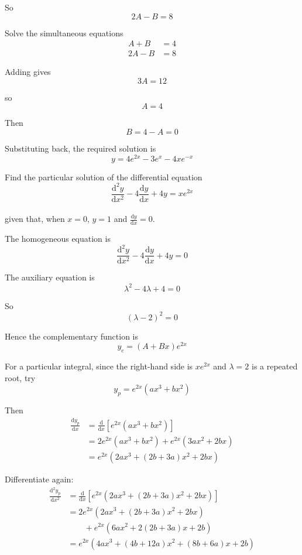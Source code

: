 \documentclass[leqno]{article}
\begin{document}
\begin{enumerate}[
  label=\textbf{\arabic*.},
  leftmargin=*,
  topsep=0pt,
  partopsep=0pt,
  parsep=0pt
]
\begin{djsSolution}
\begin{enumerate}[label=\textbf{(\alph*)}]
So
\[
2A-B=8
\]

Solve the simultaneous equations
\begin{align*}
A+B&=4\\
2A-B&=8
\end{align*}

Adding gives
\[
3A=12
\]

so
\[
A=4
\]

Then
\[
B=4-A=0
\]

Substituting back, the required solution is
\[
y=4e^{2x}-3e^x-4xe^{-x}
\]
\end{enumerate}
\end{djsSolution}


\newpage

\questionitem

Find the particular solution of the differential equation \\
\[
\frac{\mathrm{d}^2 y}{\mathrm{d}x^2} - 4\frac{\mathrm{d}y}{\mathrm{d}x} + 4y = xe^{2x}
\] \\
given that, when $x=0$, $y=1$ and $\frac{\mathrm{d}y}{\mathrm{d}x}=0$. 

\vspace*{10pt}

\begin{djsSolution}
The homogeneous equation is
\[
\frac{\mathrm{d}^2 y}{\mathrm{d}x^2}-4\frac{\mathrm{d}y}{\mathrm{d}x}+4y=0
\]

The auxiliary equation is
\[
\lambda^2-4\lambda+4=0
\]

So
\[
(\lambda-2)^2=0
\]

Hence the complementary function is
\[
y_c=(A+Bx)e^{2x}
\]

For a particular integral, since the right-hand side is $xe^{2x}$ and $\lambda=2$ is a repeated root, try
\[
y_p=e^{2x}(ax^3+bx^2)
\]

Then
\begin{align*}
\frac{\mathrm{d}y_p}{\mathrm{d}x}
&= \frac{\mathrm{d}}{\mathrm{d}x}\left[e^{2x}(ax^3+bx^2)\right] \\
&= 2e^{2x}(ax^3+bx^2)+e^{2x}(3ax^2+2bx) \\
&= e^{2x}\left(2ax^3+(2b+3a)x^2+2bx\right)
\end{align*}

Differentiate again:
\begin{align*}
\frac{\mathrm{d}^2y_p}{\mathrm{d}x^2}
&= \frac{\mathrm{d}}{\mathrm{d}x}\left[e^{2x}\left(2ax^3+(2b+3a)x^2+2bx\right)\right] \\
&= 2e^{2x}\left(2ax^3+(2b+3a)x^2+2bx\right) \\
&\qquad +e^{2x}\left(6ax^2+2(2b+3a)x+2b\right) \\
&= e^{2x}\left(4ax^3+(4b+12a)x^2+(8b+6a)x+2b\right)
\end{align*}


\end{djsSolution}
\end{enumerate}
\end{document}
